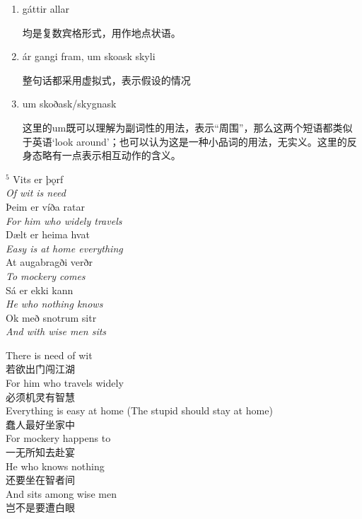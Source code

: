 \begin{grammar*}{}
    \begin{enumerate}[leftmargin=*]
        \item gáttir allar

              均是复数宾格形式，用作地点状语。

        \item \'a\dh r gangi fram, um sko\dh ask skyli

              整句话都采用虚拟式，表示假设的情况

        \item um skoðask/skygnask

              这里的um既可以理解为副词性的用法，表示“周围”，那么这两个短语都类似于英语`look around'；也可以认为这是一种小品词的用法，无实义。这里的反身态略有一点表示相互动作的含义。

    \end{enumerate}
\end{grammar*}
\medskip %
\begin{paracol}{2}
    \noindent
    $^5$ Vits er þǫrf\\
    \textit{Of wit is need}\\
    \MakeUppercase þeim er víða ratar\\
    \textit{For him who widely travels}\\
    Dælt er heima hvat\\
    \textit{Easy is at home everything}\\
    At augabragði verðr\\
    \textit{To mockery comes}\\
    Sá er ekki kann \\
    \textit{He who nothing knows}\\
    Ok með snotrum sitr\\
    \textit{And with wise men sits}\\

    \switchcolumn

    \noindent
    There is need of wit\\
    若欲出门闯江湖\\
    For him who travels widely\\
    必须机灵有智慧\\
    Everything is easy at home (The stupid should stay at home)\\
    蠢人最好坐家中\\
    For mockery happens to\\
    一无所知去赴宴\\
    He who knows nothing\\
    还要坐在智者间\\
    And sits among wise men\\
    岂不是要遭白眼\\
\end{paracol}
